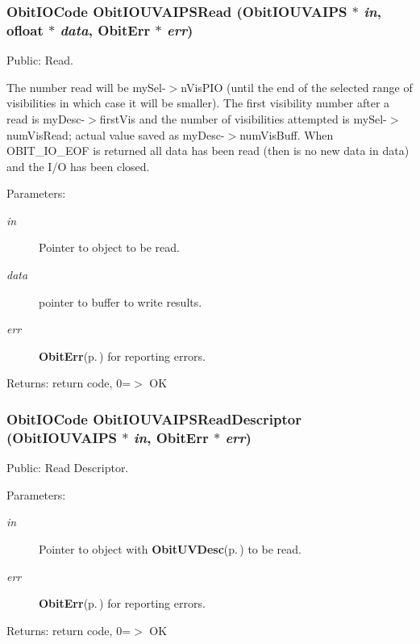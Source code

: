 \subsubsection{\setlength{\rightskip}{0pt plus 5cm}Obit\-IOCode Obit\-IOUVAIPSRead ({\bf Obit\-IOUVAIPS} $\ast$ {\em in}, {\bf ofloat} $\ast$ {\em data}, {\bf Obit\-Err} $\ast$ {\em err})}\label{ObitIOUVAIPS_8c_a19}


Public: Read. 

The number read will be my\-Sel-$>$n\-Vis\-PIO (until the end of the selected range of visibilities in which case it will be smaller). The first visibility number after a read is my\-Desc-$>$first\-Vis and the number of visibilities attempted is my\-Sel-$>$num\-Vis\-Read; actual value saved as my\-Desc-$>$num\-Vis\-Buff. When OBIT\_\-IO\_\-EOF is returned all data has been read (then is no new data in data) and the I/O has been closed. \begin{Desc}
\item[Parameters:]
\begin{description}
\item[{\em in}]Pointer to object to be read. \item[{\em data}]pointer to buffer to write results. \item[{\em err}]{\bf Obit\-Err}{\rm (p.\,\pageref{structObitErr})} for reporting errors. \end{description}
\end{Desc}
\begin{Desc}
\item[Returns:]return code, 0=$>$ OK \end{Desc}
\subsubsection{\setlength{\rightskip}{0pt plus 5cm}Obit\-IOCode Obit\-IOUVAIPSRead\-Descriptor ({\bf Obit\-IOUVAIPS} $\ast$ {\em in}, {\bf Obit\-Err} $\ast$ {\em err})}\label{ObitIOUVAIPS_8c_a26}


Public: Read Descriptor. 

\begin{Desc}
\item[Parameters:]
\begin{description}
\item[{\em in}]Pointer to object with {\bf Obit\-UVDesc}{\rm (p.\,\pageref{structObitUVDesc})} to be read. \item[{\em err}]{\bf Obit\-Err}{\rm (p.\,\pageref{structObitErr})} for reporting errors. \end{description}
\end{Desc}
\begin{Desc}
\item[Returns:]return code, 0=$>$ OK \end{Desc}
